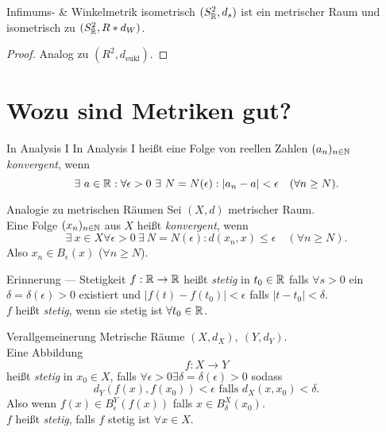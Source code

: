 \begin{theorem}{Infimums- \& Winkelmetrik isometrisch}
  $ (S^2_{\mathbb{R}}, d_s) $ ist ein metrischer Raum und isometrisch zu $ (S^2_{\mathbb{R}}, R*d_W) $.
  \begin{proof}
    Analog zu $ (R^2, d_\text{eukl}) $.
  \end{proof}
\end{theorem}

\section{Wozu sind Metriken gut?}

\begin{bla}{In Analysis I}
  In Analysis I heißt eine Folge von reellen Zahlen $ (a_n)_{n \in \mathbb{N}} $ \emph{konvergent}, wenn
  \begin{equation*}
    \exists \ a \in \mathbb{R} : \forall \epsilon > 0 \ \exists \ N = N(\epsilon) : \vert a_n - a \vert < \epsilon \quad (\forall n \geq N)\text{.}
  \end{equation*}
\end{bla}

\begin{bla}{Analogie zu metrischen Räumen}
  Sei $ (X, d) $ metrischer Raum. \\
  Eine Folge $ (x_n)_{n \in \mathbb{N}} $ aus $ X $ heißt \emph{konvergent}, wenn
  \begin{equation*}
    \exists \ x \in X \forall \epsilon > 0 \ \exists \ N = N(\epsilon) : d(x_n, x) \leq \epsilon \quad (\forall n \geq N)\text{.}
  \end{equation*}
  Also $ x_n \in B_\epsilon(x) $ ($ \forall n \geq N $).
\end{bla}

\begin{bla}{Erinnerung --- Stetigkeit}
  $ f: \mathbb{R} \to \mathbb{R} $ heißt \emph{stetig} in $ t_0 \in \mathbb{R} $ falls $ \forall s > 0 $ ein $ \delta = \delta(\epsilon) > 0 $ existiert und $ \vert f(t)-f(t_0) \vert < \epsilon $ falls $ \vert t - t_0 \vert < \delta $. \\
  $ f $ heißt \emph{stetig}, wenn sie stetig ist $ \forall t_0 \in \mathbb{R} $.
\end{bla}

\begin{bla}{Verallgemeinerung}
  Metrische Räume $ (X, d_X), \ (Y, d_Y) $. \\
  Eine Abbildung
  \begin{equation*}
    f: X \to Y
  \end{equation*}
  heißt \emph{stetig} in $ x_0 \in X $, falls $ \forall \epsilon > 0 \exists \delta = \delta(\epsilon) > 0 $ sodass
  \begin{equation*}
    d_Y(f(x), f(x_0)) < \epsilon \text{ falls } d_X(x, x_0) < \delta\text{.}
  \end{equation*}
  Also wenn $ f(x) \in B_\epsilon^Y(f(x)) $ falls $ x \in B_\delta^X(x_0) $. \\
  $ f $ heißt \emph{stetig}, falls $ f $ stetig ist $ \forall x \in X $.
\end{bla}

